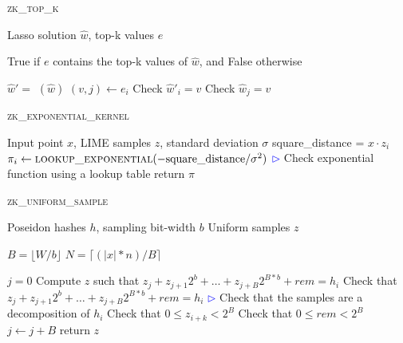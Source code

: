 \begin{algorithm}[htbp]
\begin{algorithmic}[1]
   \caption{\textsc{zk\_top\_k}}
   \label{alg:zk_top_k}

     Lasso solution $\hat{w}$, top-k values $e$

     True if $e$ contains the top-k values of $\hat{w}$, and False otherwise

    \STATE $\hat{w}' = $ $(\hat{w})$
    \STATE $(v, j) \gets e_i$
    \STATE Check $\hat{w}'_i = v$
    \STATE Check $\hat{w}_j = v$
    \ENDFOR
\end{algorithmic}
\end{algorithm}

\begin{algorithm}[htbp]
\begin{algorithmic}[1]
   \caption{\textsc{zk\_exponential\_kernel}}
   \label{alg:zk_exponential_kernel}
     Input point $x$, LIME samples $z$, standard deviation $\sigma$
        \STATE square\_distance = $x \cdot z_i$
         \STATE $\pi_i \gets \textsc{lookup\_exponential}(-\rm{square\_distance} / \sigma^2)$
            \hfill\textcolor{blue}{$\rhd$} Check exponential function using a lookup table
    \ENDFOR
    \STATE return $\pi$
\end{algorithmic}
\end{algorithm}

\begin{algorithm}[htbp]
\begin{algorithmic}[1]
   \caption{\textsc{zk\_uniform\_sample}}
   \label{alg:zk_uniform_sample}
     Poseidon hashes $h$, sampling bit-width $b$
     Uniform samples $z$

    \STATE $B = \lfloor W / b \rfloor$
    \STATE $N = \lceil (|x| * n) / B \rceil$
    
    \STATE $j = 0$
        \STATE Compute $z$ such that $z_j + z_{j+1}2^b + \ldots + z_{j+B}2^{B * b} + rem = h_i$
        \STATE Check that $z_j + z_{j+1}2^b + \ldots + z_{j+B}2^{B * b} + rem = h_i$ \hfill\textcolor{blue}{$\rhd$} Check that the samples are a decomposition of $h_i$
            \STATE Check that $0 \leq z_{i + k} < 2^B$
        \ENDFOR
        \STATE Check that $0 \leq rem < 2^B$
        \STATE $j \leftarrow j + B$
    \ENDFOR
    \STATE return $z$
\end{algorithmic}
\end{algorithm}

